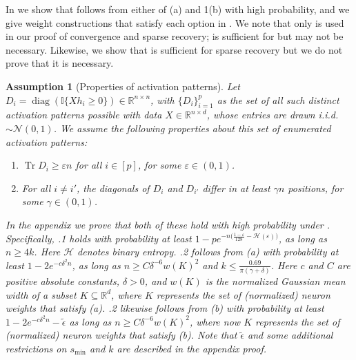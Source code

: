 \documentclass{article} %
\DeclareMathOperator{\Tr}{Tr}
\newcommand{\n}{\ensuremath{n}}
\newcommand{\p}{\ensuremath{p}}
\newcommand{\datadim}{\ensuremath{d}}
\newcommand{\X}{\ensuremath{X}}
\newcommand{\h}{\ensuremath{h}}
\newtheorem{assumption}{Assumption}
\DeclareMathOperator{\diag}{diag}
\newcommand{\1}{\ensuremath{{\sf (i)}}}
\newcommand{\2}{\ensuremath{{\sf (ii)}}}
\newcommand{\3}{\ensuremath{{\sf (iii)}}}
\newcommand{\4}{\ensuremath{{\sf (iv)}}}
\newcommand{\5}{\ensuremath{{\sf (v)}}}
\newcommand{\6}{\ensuremath{{\sf (vi)}}}
\newcommand{\R}{\mathbb{R}}
\begin{document}
In  we show that  follows from either of (a) and 1(b) with high probability, and we give weight constructions that satisfy each option in . We note that only  is used in our proof of convergence and sparse recovery;  is sufficient for  but may not be necessary. Likewise, we show that  is sufficient for sparse recovery but we do not prove that it is necessary.
\begin{assumption}[Properties of activation patterns] \label{assumptions}
\label{assumption 2}
    Let $D_i = \diag{(\mathbb{I}\{\X\h_i \geq 0\})} \in \R^{\n \times \n}$, with $\{D_i\}_{i=1}^\p$ as the set of all such distinct activation patterns possible with data $\X \in \R^{\n \times \datadim}$, whose entries are drawn i.i.d. $\sim \mathcal{N}(0,1)$. We assume the following properties about this set of enumerated activation patterns:
    \begin{enumerate}
        \item $\Tr{D_i} \geq \varepsilon \n$ for all $i \in [\p]$, for some $\varepsilon \in (0,1)$.
        \item For all $i \neq i'$, the diagonals of $D_i$ and $D_{i'}$ differ in at least $\gamma \n$ positions, for some $\gamma \in (0,1)$.
    \end{enumerate}
    In the appendix we prove that both of these hold with high probability under . Specifically, .1 holds with probability at least $1 - \p e^{-\n\big(\frac{1-\varepsilon}{128}-\mathcal{H}(\varepsilon) \big)}$, as long as $\n \geq 4k$. Here $\mathcal{H}$ denotes binary entropy.
    .2 follows from (a) with probability at least $1-2e^{-c\delta^2\n}$, as long as $\n \geq C\delta^{-6}w(K)^2$ and $k \leq \frac{0.69}{\pi(\gamma+\delta)}$. Here $c$ and $C$ are positive absolute constants, $\delta > 0$, and $w(K)$ is the normalized Gaussian mean width of a subset $K \subseteq \R^{d}$, where $K$ represents the set of (normalized) neuron weights that satisfy (a).
    .2 likewise follows from (b) with probability at least $1-2e^{-c\delta^2\n}-\tilde\epsilon$ as long as $\n \geq C\delta^{-6}w(K)^2$, where now $K$ represents the set of (normalized) neuron weights that satisfy (b). Note that $\tilde\epsilon$ and some additional restrictions on $s_{\min}$ and $k$ are described in the appendix proof.
\end{assumption}
\end{document}
